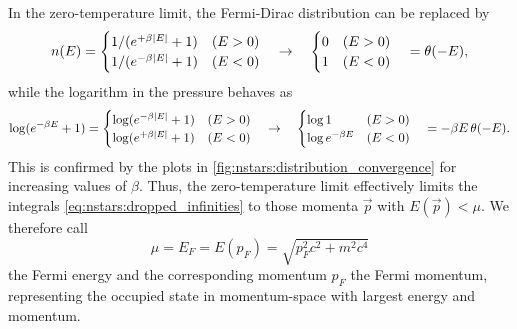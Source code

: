 In the zero-temperature limit, the Fermi-Dirac distribution can be replaced by
\begin{equation}
	n(E)       =                 \begin{cases} 1 / (e^{+\beta \left\lvert E \right\rvert}+1) & (E>0) \\ 1 / (e^{-\beta \left\lvert E \right\rvert}+1) & (E<0) \end{cases}
	     \quad \rightarrow \quad \begin{cases} 0 & (E>0) \\ 1 & (E<0) \end{cases}
	     \quad =                 \theta(-E) ,
\end{equation}
while the logarithm in the pressure behaves as
\begin{equation}
	\log (e^{-\beta E}+1)       =                 \begin{cases} \log (e^{-\beta \left\lvert E \right\rvert}+1) & (E>0) \\ \log (e^{+\beta \left\lvert E \right\rvert}+1) & (E<0) \end{cases}
	                      \quad \rightarrow \quad \begin{cases} \log 1 & (E>0) \\ \log e^{-\beta E} & (E<0) \end{cases}
	                      \quad =                 -\beta E \, \theta(-E) .
\end{equation}
This is confirmed by the plots in \cref{fig:nstars:distribution_convergence} for increasing values of $\beta$.
Thus, the zero-temperature limit effectively limits the integrals \eqref{eq:nstars:dropped_infinities} to those momenta $\vec{p}$ with $E(\vec{p}) < \mu$.
We therefore call
\begin{equation}
	\mu = E_F = E(p_F) = \sqrt{p_F^2 c^2 + m^2 c^4}
\end{equation}
the Fermi energy and the corresponding momentum $p_F$ the Fermi momentum, representing the occupied state in momentum-space with largest energy and momentum.

